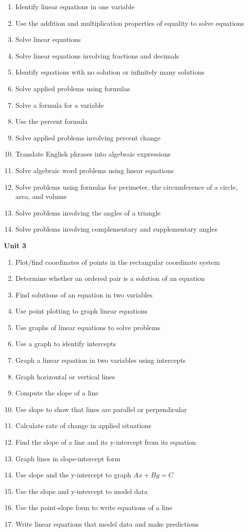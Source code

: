 \documentclass[10pt]{article}
\newenvironment{alphalist}{
\begin{enumerate}[label=(\arabic*),widest=107 ,leftmargin=25pt, itemsep=0pt]}
{\end{enumerate}}
\begin{document}
\begin{alphalist}
    \item Identify linear equations in one variable
    \item Use the addition and multiplication properties of equality to solve equations
    \item Solve linear equations
    \item Solve linear equations involving fractions and decimals
    \item Identify equations with no solution or infinitely many solutions
    \item Solve applied problems using formulas
    \item Solve a formula for a variable
    \item Use the percent formula
    \item Solve applied problems involving percent change
    \item Translate English phrases into algebraic expressions
    \item Solve algebraic word problems using linear equations
    \item Solve problems using formulas for perimeter, the circumference of a circle, area, and volume
    \item Solve problems involving the angles of a triangle
    \item Solve problems involving complementary and supplementary angles
\end{alphalist}
\noindent \textbf{Unit  3}
 \begin{alphalist}
    \item Plot/find coordinates of points in the rectangular coordinate system
    \item Determine whether an ordered pair is a solution of an equation
    \item Find solutions of an equation in two variables
    \item Use point plotting to graph linear equations
    \item Use graphs of linear equations to solve problems
    \item Use a graph to identify intercepts
    \item Graph a linear equation in two variables using intercepts
    \item Graph horizontal or vertical lines
    \item Compute the slope of a line
    \item Use slope to show that lines are parallel or perpendicular
    \item Calculate rate of change in applied situations
    \item Find the slope of a line and its y-intercept from its equation
    \item Graph lines in slope-intercept form
    \item Use slope and the y-intercept to graph $Ax + By = C$
    \item Use the slope and y-intercept to model data
    \item Use the point-slope form to write equations of a line
    \item Write linear equations that model data and make predictions
 \end{alphalist}
\end{document}

